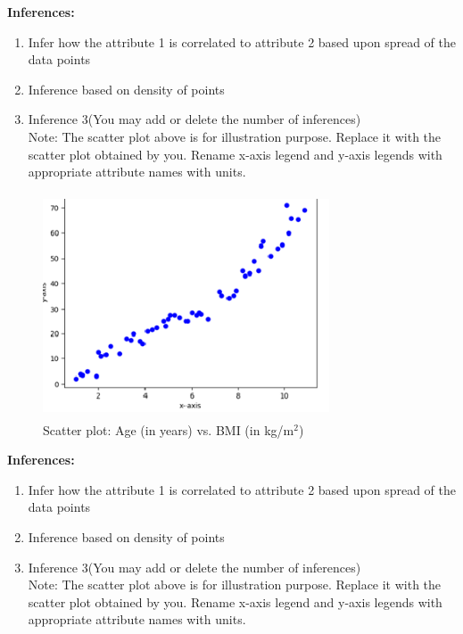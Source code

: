 \documentclass[12 pt, a4paper]{article}
\theoremstyle{definition}
\begin{document}
\textbf{\Large Inferences:}
\begin{enumerate}
   \item Infer how the attribute 1 is correlated to attribute 2 based upon spread of the data points
   \item Inference based on density of points
   \item Inference 3(You may add or delete the number of inferences)
\\Note: The scatter plot above is for illustration purpose. Replace it with the scatter plot obtained by you. Rename x-axis legend and y-axis legends with appropriate attribute names with units.

\end{enumerate}

\begin{figure}[H]
	\centering
	\includegraphics[width=8.5cm,height=6.65cm]{Scatter Plot.png}
	\caption{Scatter plot: Age (in years) vs. BMI (in kg/m$^{2 }$)}
	\label{Blockdia}
\end{figure}

\textbf{\Large Inferences:}
\begin{enumerate}
   \item Infer how the attribute 1 is correlated to attribute 2 based upon spread of the data points
   \item Inference based on density of points
   \item Inference 3(You may add or delete the number of inferences)
\\Note: The scatter plot above is for illustration purpose. Replace it with the scatter plot obtained by you. Rename x-axis legend and y-axis legends with appropriate attribute names with units.

\end{enumerate}
\end{document}

